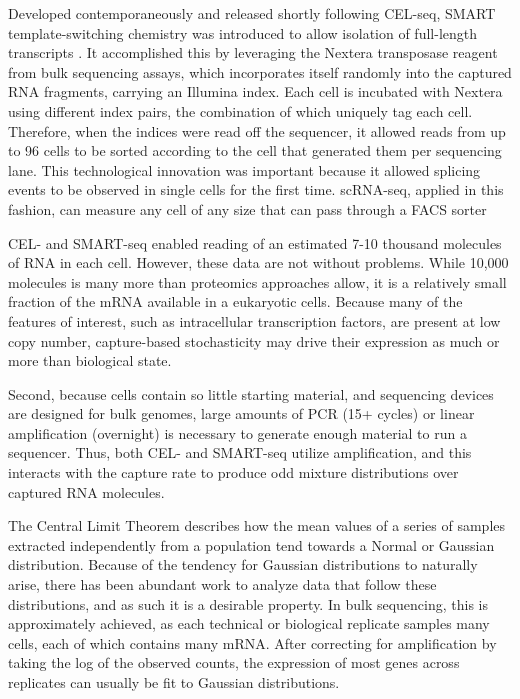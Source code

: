 Developed contemporaneously and released shortly following CEL-seq, SMART template-switching chemistry was introduced to allow isolation of full-length transcripts \citep{Ramskoeld2012}.
It accomplished this by leveraging the Nextera transposase reagent from bulk sequencing assays, which incorporates itself randomly into the captured RNA fragments, carrying an Illumina index. 
Each cell is incubated with Nextera using different index pairs, the combination of which uniquely tag each cell. 
Therefore, when the indices were read off the sequencer, it allowed reads from up to 96 cells to be sorted according to the cell that generated them per sequencing lane.
This technological innovation was important because it allowed splicing events to be observed in single cells for the first time.
scRNA-seq, applied in this fashion, can measure any cell of any size that can pass through a FACS sorter

CEL- and SMART-seq enabled reading of an estimated 7-10 thousand molecules of RNA in each cell. 
However, these data are not without problems. 
While 10,000 molecules is many more than proteomics approaches allow, it is a relatively small fraction of the mRNA available in a eukaryotic cells. 
Because many of the features of interest, such as intracellular transcription factors, are present at low copy number, capture-based stochasticity may drive their expression as much or more than biological state. 

Second, because cells contain so little starting material, and sequencing devices are designed for bulk genomes, large amounts of PCR (15+ cycles) or linear amplification (overnight) is necessary to generate enough material to run a sequencer. 
Thus, both CEL- and SMART-seq utilize amplification, and this interacts with the capture rate to produce odd mixture distributions over captured RNA molecules. 

The Central Limit Theorem describes how the mean values of a series of samples extracted independently from a population tend towards a Normal or Gaussian distribution.
Because of the tendency for Gaussian distributions to naturally arise, there has been abundant work to analyze data that follow these distributions, and as such it is a desirable property. 
In bulk sequencing, this is approximately achieved, as each technical or biological replicate samples many cells, each of which contains many mRNA. 
After correcting for amplification by taking the log of the observed counts, the expression of most genes across replicates can usually be fit to Gaussian distributions. 

